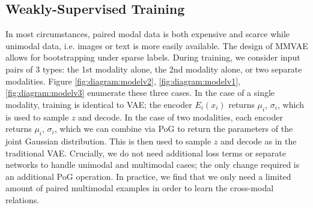\documentclass{article}
\begin{document}
\subsection{Weakly-Supervised Training}
In most circumstances, paired modal data is both expensive and scarce while unimodal data, i.e. images or text is more easily available. The design of MMVAE allows for bootstrapping under sparse labels. During training, we consider input pairs of 3 types: the 1st modality alone,  the 2nd modality alone, or two separate modalities. Figure \ref{fig:diagram:modelv2}, \ref{fig:diagram:modelv1}, \ref{fig:diagram:modelv3} enumerate these three cases. In the case of a single modality, training is identical to VAE; the encoder $E_{i}(x_{i})$ returns $\mu_{i}$, $\sigma_{i}$, which is used to sample $z$ and decode. In the case of two modalities, each encoder returns $\mu_{i}$, $\sigma_{i}$, which we can combine via PoG to return the parameters of the joint Gaussian distribution. This is then used to sample $z$ and decode as in the traditional VAE. Crucially, we do not need additional loss terms or separate networks to handle unimodal and multimodal cases; the only change required is an additional PoG operation. In practice, we find that we only need a limited amount of paired multimodal examples in order to learn the cross-modal relations. 


{\small
\linespread{1}

}
\end{document}
